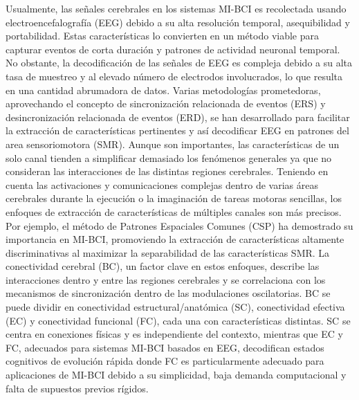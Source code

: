 Usualmente, las señales cerebrales en los sistemas MI-BCI es recolectada usando electroencefalografía (EEG) debido a su alta resolución temporal, asequibilidad y portabilidad. Estas características lo convierten en un método viable para capturar eventos de corta duración y patrones de actividad neuronal temporal. No obstante, la decodificación de las señales de EEG es compleja debido a su alta tasa de muestreo y al elevado número de electrodos involucrados, lo que resulta en una cantidad abrumadora de datos. Varias metodologías prometedoras, aprovechando el concepto de sincronización relacionada de eventos (ERS) y desincronización relacionada de eventos (ERD), se han desarrollado para facilitar la extracción de características pertinentes y así decodificar EEG en patrones del area sensoriomotora (SMR). Aunque son importantes, las características de un solo canal tienden a simplificar demasiado los fenómenos generales ya que no consideran las interacciones de las distintas regiones cerebrales. Teniendo en cuenta las activaciones y comunicaciones complejas dentro de varias áreas cerebrales durante la ejecución o la imaginación de tareas motoras sencillas, los enfoques de extracción de características de múltiples canales son más precisos. Por ejemplo, el método de Patrones Espaciales Comunes (CSP) ha demostrado su importancia en MI-BCI, promoviendo la extracción de características altamente discriminativas al maximizar la separabilidad de las características SMR. La conectividad cerebral (BC), un factor clave en estos enfoques, describe las interacciones dentro y entre las regiones cerebrales y se correlaciona con los mecanismos de sincronización dentro de las modulaciones oscilatorias. BC se puede dividir en conectividad estructural/anatómica (SC), conectividad efectiva (EC) y conectividad funcional (FC), cada una con características distintas. SC se centra en conexiones físicas y es independiente del contexto, mientras que EC y FC, adecuados para sistemas MI-BCI basados en EEG, decodifican estados cognitivos de evolución rápida donde FC es particularmente adecuado para aplicaciones de MI-BCI debido a su simplicidad, baja demanda computacional y falta de supuestos previos rígidos.

